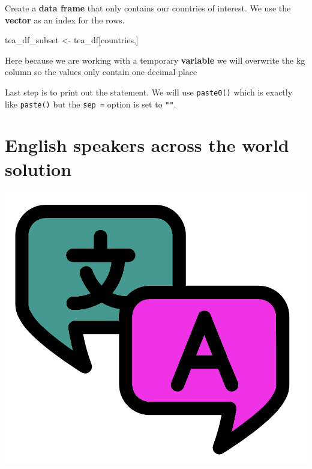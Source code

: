 \documentclass[]{book}
\newenvironment{Shaded}{\begin{snugshade}}{\end{snugshade}}
\newcommand{\KeywordTok}[1]{\textcolor[rgb]{0.13,0.29,0.53}{\textbf{#1}}}
\newcommand{\DataTypeTok}[1]{\textcolor[rgb]{0.13,0.29,0.53}{#1}}
\newcommand{\DecValTok}[1]{\textcolor[rgb]{0.00,0.00,0.81}{#1}}
\newcommand{\StringTok}[1]{\textcolor[rgb]{0.31,0.60,0.02}{#1}}
\newcommand{\OperatorTok}[1]{\textcolor[rgb]{0.81,0.36,0.00}{\textbf{#1}}}
\newcommand{\NormalTok}[1]{#1}
\begin{document}
Create a \textbf{data frame} that only contains our countries of
interest. We use the \textbf{vector} as an index for the rows.

\begin{Shaded}
\begin{Highlighting}[]
\NormalTok{tea_df_subset <-}\StringTok{ }\NormalTok{tea_df[countries,]}
\end{Highlighting}
\end{Shaded}

Here because we are working with a temporary \textbf{variable} we will
overwrite the kg column so the values only contain one decimal place

\begin{Shaded}
\end{Shaded}

Last step is to print out the statement. We will use \texttt{paste0()}
which is exactly like \texttt{paste()} but the \texttt{sep\ =} option is
set to \texttt{""}.

\begin{Shaded}
\end{Shaded}

\section{English speakers across the world
solution}\label{english-speakers-across-the-world-solution}

\begin{center}\includegraphics[width=0.2\linewidth]{figures/language} \end{center}
\end{document}
